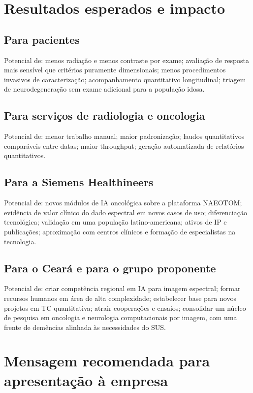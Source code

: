 \documentclass[11pt,a4paper]{article}
\begin{document}
\section{Resultados esperados e impacto}

\subsection{Para pacientes}
Potencial de: menos radiação e menos contraste por exame; avaliação de resposta mais sensível que critérios puramente dimensionais; menos procedimentos invasivos de caracterização; acompanhamento quantitativo longitudinal; triagem de neurodegeneração sem exame adicional para a população idosa.

\subsection{Para serviços de radiologia e oncologia}
Potencial de: menor trabalho manual; maior padronização; laudos quantitativos comparáveis entre datas; maior throughput; geração automatizada de relatórios quantitativos.

\subsection{Para a Siemens Healthineers}
Potencial de: novos módulos de IA oncológica sobre a plataforma NAEOTOM; evidência de valor clínico do dado espectral em novos casos de uso; diferenciação tecnológica; validação em uma população latino-americana; ativos de IP e publicações; aproximação com centros clínicos e formação de especialistas na tecnologia.

\subsection{Para o Ceará e para o grupo proponente}
Potencial de: criar competência regional em IA para imagem espectral; formar recursos humanos em área de alta complexidade; estabelecer base para novos projetos em TC quantitativa; atrair cooperações e ensaios; consolidar um núcleo de pesquisa em oncologia e neurologia computacionais por imagem, com uma frente de demências alinhada às necessidades do SUS.

\section{Mensagem recomendada para apresentação à empresa}
\end{document}
